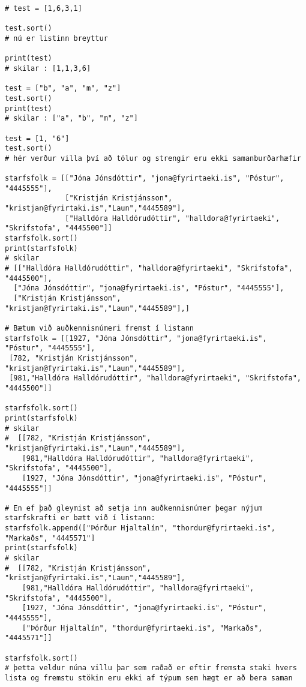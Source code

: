 \begin{lstlisting}[caption=.sort() aðferðin, label=lst:listar-sort]
# test = [1,6,3,1]

test.sort()
# nú er listinn breyttur

print(test)
# skilar : [1,1,3,6]

test = ["b", "a", "m", "z"]
test.sort()
print(test)
# skilar : ["a", "b", "m", "z"]

test = [1, "6"]
test.sort()
# hér verður villa því að tölur og strengir eru ekki samanburðarhæfir

starfsfolk = [["Jóna Jónsdóttir", "jona@fyrirtaeki.is", "Póstur", "4445555"],
			  ["Kristján Kristjánsson", "kristjan@fyrirtaki.is","Laun","4445589"],
			  ["Halldóra Halldórudóttir", "halldora@fyrirtaeki", "Skrifstofa", "4445500"]]
starfsfolk.sort()
print(starfsfolk)
# skilar 
# [["Halldóra Halldórudóttir", "halldora@fyrirtaeki", "Skrifstofa", "4445500"],
  ["Jóna Jónsdóttir", "jona@fyrirtaeki.is", "Póstur", "4445555"],
  ["Kristján Kristjánsson", "kristjan@fyrirtaki.is","Laun","4445589"],]
  
# Bætum við auðkennisnúmeri fremst í listann
starfsfolk = [[1927, "Jóna Jónsdóttir", "jona@fyrirtaeki.is", "Póstur", "4445555"],
 [782, "Kristján Kristjánsson", "kristjan@fyrirtaki.is","Laun","4445589"],
 [981,"Halldóra Halldórudóttir", "halldora@fyrirtaeki", "Skrifstofa", "4445500"]]
		     
starfsfolk.sort()
print(starfsfolk)
# skilar
#  [[782, "Kristján Kristjánsson", "kristjan@fyrirtaki.is","Laun","4445589"],
	[981,"Halldóra Halldórudóttir", "halldora@fyrirtaeki", "Skrifstofa", "4445500"],
	[1927, "Jóna Jónsdóttir", "jona@fyrirtaeki.is", "Póstur", "4445555"]]
	
# En ef það gleymist að setja inn auðkennisnúmer þegar nýjum starfskrafti er bætt við í listann:
starfsfolk.append(["Þórður Hjaltalín", "thordur@fyrirtaeki.is", "Markaðs", "4445571"]
print(starfsfolk)
# skilar
#  [[782, "Kristján Kristjánsson", "kristjan@fyrirtaki.is","Laun","4445589"],
	[981,"Halldóra Halldórudóttir", "halldora@fyrirtaeki", "Skrifstofa", "4445500"],
	[1927, "Jóna Jónsdóttir", "jona@fyrirtaeki.is", "Póstur", "4445555"],
	["Þórður Hjaltalín", "thordur@fyrirtaeki.is", "Markaðs", "4445571"]]

starfsfolk.sort() 
# þetta veldur núna villu þar sem raðað er eftir fremsta staki hvers lista og fremstu stökin eru ekki af týpum sem hægt er að bera saman
\end{lstlisting}